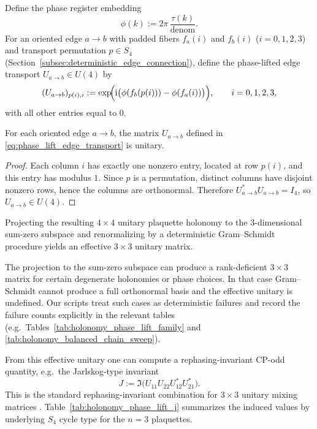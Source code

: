 Define the phase register embedding
\begin{equation}\label{eq:holonomy_phase_def}
\phi(k):=2\pi\,\frac{\tau(k)}{\mathrm{denom}}.
\end{equation}
For an oriented edge $a\to b$ with padded fibers $f_a(i)$ and $f_b(i)$ ($i=0,1,2,3$) and transport permutation $p\in S_4$ (Section~\ref{subsec:deterministic_edge_connection}), define the phase-lifted edge transport $U_{a\to b}\in U(4)$ by
\begin{equation}\label{eq:phase_lift_edge_transport}
(U_{a\to b})_{p(i),i}:=\exp\!\Bigl(\mathrm{i}\bigl(\phi(f_b(p(i)))-\phi(f_a(i))\bigr)\Bigr),
\qquad i=0,1,2,3,
\end{equation}
with all other entries equal to $0$.

\begin{lemma}\label{lem:phase_lift_edge_unitary}
For each oriented edge $a\to b$, the matrix $U_{a\to b}$ defined in \eqref{eq:phase_lift_edge_transport} is unitary.
\end{lemma}
\begin{proof}
Each column $i$ has exactly one nonzero entry, located at row $p(i)$, and this entry has modulus $1$.
Since $p$ is a permutation, distinct columns have disjoint nonzero rows, hence the columns are orthonormal.
Therefore $U_{a\to b}^\ast U_{a\to b}=I_4$, so $U_{a\to b}\in U(4)$.
\end{proof}

Projecting the resulting $4\times 4$ unitary plaquette holonomy to the $3$-dimensional sum-zero subspace and renormalizing by a deterministic Gram--Schmidt procedure yields an effective $3\times 3$ unitary matrix.
\begin{remark}\label{rem:gram_schmidt_failures}
The projection to the sum-zero subspace can produce a rank-deficient $3\times 3$ matrix for certain degenerate holonomies or phase choices.
In that case Gram--Schmidt cannot produce a full orthonormal basis and the effective unitary is undefined.
Our scripts treat such cases as deterministic failures and record the failure counts explicitly in the relevant tables (e.g.\ Tables~\ref{tab:holonomy_phase_lift_family} and \ref{tab:holonomy_balanced_chain_sweep}).
\end{remark}
From this effective unitary one can compute a rephasing-invariant CP-odd quantity, e.g.\ the Jarlskog-type invariant
\[
J:=\Im\!\bigl(U_{11}U_{22}U_{12}^\ast U_{21}^\ast\bigr).
\]
This is the standard rephasing-invariant combination for $3\times 3$ unitary mixing matrices \cite{Jarlskog1985,PDGRPP2024}.
Table~\ref{tab:holonomy_phase_lift_j} summarizes the induced values by underlying $S_4$ cycle type for the $n=3$ plaquettes.


